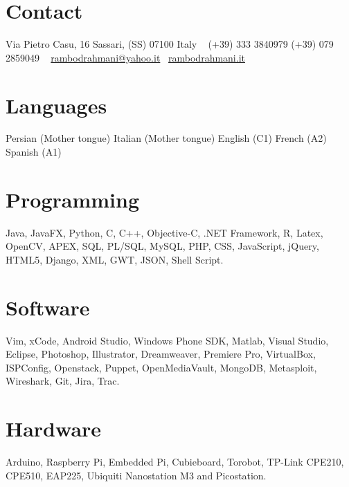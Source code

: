 \documentclass[]{friggeri-cv}
\begin{document}


\begin{aside}
\section{Contact}
Via Pietro Casu, 16
Sassari, (SS) 07100
Italy
~
(+39) 333 3840979
(+39) 079 2859049
~
\small{\href{mailto:rambodrahmani@yahoo.it}{{rambodrahmani@yahoo.it}}}
\small{{\faGlobe}}~\href{http://rambodrahmani.it}{{rambodrahmani.it}}\vspace{6mm}
\section{Languages}
Persian (Mother tongue)
Italian (Mother tongue)
English (C1)
French (A2)
Spanish (A1)\vspace{6mm}
\section{Programming \small{\textcolor{magenta}{{\faHeart}}}}
Java, JavaFX, Python, C, C++, Objective-C, .NET Framework, R, Latex,
OpenCV, APEX, SQL, PL/SQL, MySQL, PHP, CSS, JavaScript, jQuery,
HTML5, Django, XML, GWT, JSON, Shell Script.\vspace{6mm}
\section{Software}
Vim, xCode, Android Studio, Windows Phone SDK, Matlab, Visual
Studio, Eclipse, Photoshop, Illustrator, Dreamweaver, Premiere
Pro, VirtualBox, ISPConfig, Openstack, Puppet, OpenMediaVault,
MongoDB, Metasploit, Wireshark, Git, Jira, Trac.\vspace{6mm}
\section{Hardware}
Arduino, Raspberry Pi, Embedded Pi, Cubieboard, Torobot,
TP-Link CPE210, CPE510, EAP225, Ubiquiti Nanostation M3
and Picostation.
\end{aside}
\end{document}
